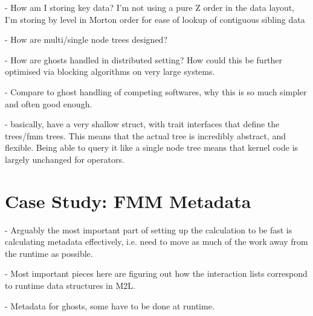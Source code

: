 - How am I storing key data? I'm not using a pure Z order in the data layout, I'm storing by level in Morton order for ease of lookup of contiguous sibling data

- How are multi/single node trees designed?

- How are ghosts handled in distributed setting? How could this be further optimised via blocking algorithms on very large systems.

- Compare to ghost handling of competing softwares, why this is so much simpler and often good enough.

- basically, have a very shallow struct, with trait interfaces that define the trees/fmm trees. This means that the actual tree is incredibly abstract, and flexible. Being able to query it like a single node tree means that kernel code is largely unchanged for operators.

\section{Case Study: FMM Metadata}\label{chpt:software_design:sec:metadata}

- Arguably the most important part of setting up the calculation to be fast is calculating metadata effectively, i.e. need to move as much of the work away from the runtime as possible.

- Most important pieces here are figuring out how the interaction lists correspond to runtime data structures in M2L.

- Metadata for ghosts, some have to be done at runtime.




